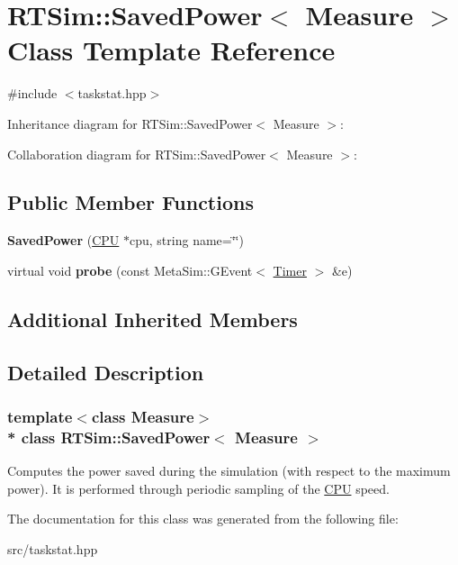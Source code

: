 \hypertarget{classRTSim_1_1SavedPower}{}\section{R\+T\+Sim\+:\+:Saved\+Power$<$ Measure $>$ Class Template Reference}
\label{classRTSim_1_1SavedPower}


{\ttfamily \#include $<$taskstat.\+hpp$>$}



Inheritance diagram for R\+T\+Sim\+:\+:Saved\+Power$<$ Measure $>$\+:


Collaboration diagram for R\+T\+Sim\+:\+:Saved\+Power$<$ Measure $>$\+:
\subsection*{Public Member Functions}
\begin{DoxyCompactItemize}
\item 
{\bfseries Saved\+Power} (\hyperlink{classRTSim_1_1CPU}{C\+PU} $\ast$cpu, string name=\char`\"{}\char`\"{})\hypertarget{classRTSim_1_1SavedPower_a9d6481c100ace2db8ce7b1fa69c9c900}{}\label{classRTSim_1_1SavedPower_a9d6481c100ace2db8ce7b1fa69c9c900}

\item 
virtual void {\bfseries probe} (const Meta\+Sim\+::\+G\+Event$<$ \hyperlink{classRTSim_1_1Timer}{Timer} $>$ \&e)\hypertarget{classRTSim_1_1SavedPower_ac11faba8eb931988b539fb5513738c06}{}\label{classRTSim_1_1SavedPower_ac11faba8eb931988b539fb5513738c06}

\end{DoxyCompactItemize}
\subsection*{Additional Inherited Members}


\subsection{Detailed Description}
\subsubsection*{template$<$class Measure$>$\\*
class R\+T\+Sim\+::\+Saved\+Power$<$ Measure $>$}

Computes the power saved during the simulation (with respect to the maximum power). It is performed through periodic sampling of the \hyperlink{classRTSim_1_1CPU}{C\+PU} speed. 

The documentation for this class was generated from the following file\+:\begin{DoxyCompactItemize}
\item 
src/taskstat.\+hpp\end{DoxyCompactItemize}
